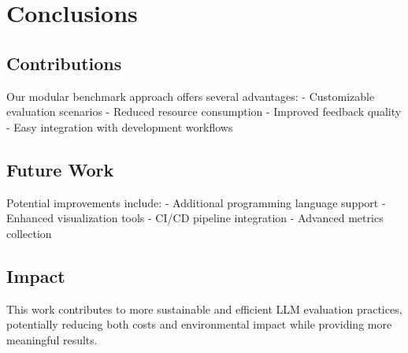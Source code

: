 \chapter{Conclusions}

\section{Contributions}

Our modular benchmark approach offers several advantages:
- Customizable evaluation scenarios
- Reduced resource consumption
- Improved feedback quality
- Easy integration with development workflows

\section{Future Work}

Potential improvements include:
- Additional programming language support
- Enhanced visualization tools
- CI/CD pipeline integration
- Advanced metrics collection

\section{Impact}

This work contributes to more sustainable and efficient LLM evaluation practices, potentially reducing both costs and environmental impact while providing more meaningful results.
